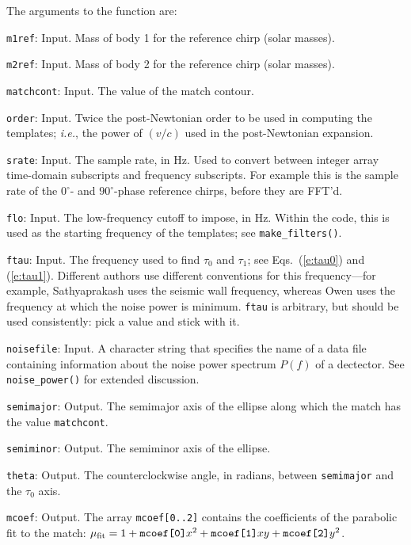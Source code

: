 The arguments to the function are:

\begin{description}
\item{\tt{m1ref}}: Input.  Mass of body 1 for the reference chirp
(solar masses).
\item{\tt{m2ref}}: Input.  Mass of body 2 for the reference chirp
(solar masses).
\item{\tt{matchcont}}: Input.  The value of the match contour.
\item{\tt{order}}: Input.  Twice the post-Newtonian order to be
used in computing the templates; {\it i.e.}, the power of $(v/c)$
used in the post-Newtonian expansion.
\item{\tt{srate}}: Input.  The sample rate, in Hz.  Used to convert
between integer array time-domain subscripts and frequency subscripts.
For example this is the sample rate of the $0^\circ$- and
$90^\circ$-phase reference chirps, before they are FFT'd.
\item{\tt{flo}}: Input. The low-frequency cutoff to impose, in
Hz. Within the code, this is used as the starting frequency of
the templates; see {\tt make\_filters()}.
\item{\tt{ftau}}: Input. The frequency used to find $\tau_0$
and $\tau_1$; see Eqs.\ (\ref{e:tau0}) and (\ref{e:tau1}).
Different authors use different conventions for this
frequency---for example, Sathyaprakash uses the seismic wall
frequency, whereas Owen uses the frequency at which the noise
power is minimum.  {\tt ftau} is arbitrary, but should be used
consistently: pick a value and stick with it.
\item{\tt{noisefile}}: Input.  A character string that specifies
the name of a data file containing information about the noise
power spectrum $P(f)$ of a dectector.  See {\tt noise\_power()}
for extended discussion.
\item{\tt{semimajor}}: Output.  The semimajor axis of the ellipse
along which the match has the value {\tt matchcont}.
\item{\tt{semiminor}}: Output.  The semiminor axis of the ellipse.
\item{\tt{theta}}: Output.  The counterclockwise angle, in radians,
between {\tt semimajor} and the $\tau_0$ axis.
\item{\tt{mcoef}}: Output.  The array {\tt mcoef[0..2]} contains the
coefficients of the parabolic fit to the match:
$\mu_{\rm fit} = 1 + {\hbox{\tt mcoef[0]}} x^2 + {\hbox{\tt mcoef[1]}} xy +
{\hbox{\tt mcoef[2]}} y^2$.
\end{description}

